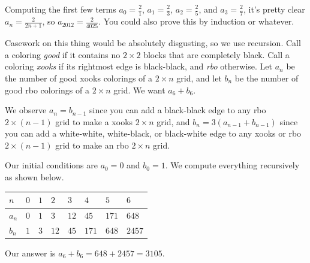 \documentclass[11pt]{scrartcl}
\begin{document}
\begin{solution}{}
    Computing the first few terms $a_0 = \frac21$, $a_1 = \frac23$, $a_2 = \frac25$, and $a_3 = \frac27$, it's pretty clear $a_n = \frac{2}{2n + 1}$, so $a_{2012} = \frac{2}{4025}$. You could also prove this by induction or whatever.
\end{solution}

\begin{solution}{}
    Casework on this thing would be absolutely disgusting, so we use recursion. Call a coloring \emph{good} if it contains no $2 \times 2$ blocks that are completely black. Call a coloring \emph{xooks} if its rightmost edge is black-black, and \emph{rbo} otherwise. Let $a_n$ be the number of good xooks colorings of a $2 \times n$ grid, and let $b_n$ be the number of good rbo colorings of a $2 \times n$ grid. We want $a_6 + b_6$.

    We observe $a_n = b_{n - 1}$ since you can add a black-black edge to any rbo $2 \times (n - 1)$ grid to make a xooks $2 \times n$ grid, and $b_n = 3(a_{n - 1} + b_{n - 1})$ since you can add a white-white, white-black, or black-white edge to any xooks or rbo $2 \times (n - 1)$ grid to make an rbo $2 \times n$ grid.

    Our initial conditions are $a_0 = 0$ and $b_0 = 1$. We compute everything recursively as shown below.

    \begin{table}[h]
        \centering
        \begin{tabular}{|l|l|l|l|l|l|l|l|}
        \hline
        $n$   & $0$ & $1$ & $2$  & $3$  & $4$   & $5$   & $6$    \\ \hline
        $a_n$ & $0$ & $1$ & $3$  & $12$ & $45$  & $171$ & $648$  \\ \hline
        $b_n$ & $1$ & $3$ & $12$ & $45$ & $171$ & $648$ & $2457$ \\ \hline
        \end{tabular}
    \end{table}
    
    Our answer is $a_6 + b_6 = 648 + 2457 = 3105$.
\end{solution}
\end{document}
